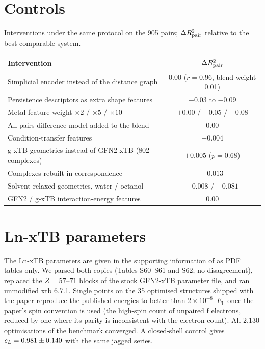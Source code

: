 \section{Controls}
\label{app:controls}
Interventions under the same protocol on the 905 pairs; $\Delta R^2_{\mathrm{pair}}$ relative to the best comparable system.
\begin{center}
  \small
  \begin{tabular}{lc}
    \toprule
    Intervention & $\Delta R^2_{\mathrm{pair}}$ \\
    \midrule
    Simplicial encoder instead of the distance graph & 0.00 ($r = 0.96$, blend weight 0.01) \\
    Persistence descriptors as extra shape features & $-0.03$ to $-0.09$ \\
    Metal-feature weight $\times 2$ / $\times 5$ / $\times 10$ & $+0.00$ / $-0.05$ / $-0.08$ \\
    All-pairs difference model added to the blend & 0.00 \\
    Condition-transfer features & $+0.004$ \\
    g-xTB geometries instead of GFN2-xTB (802 complexes) & $+0.005$ ($p = 0.68$) \\
    Complexes rebuilt in correspondence & $-0.013$ \\
    Solvent-relaxed geometries, water / octanol & $-0.008$ / $-0.081$ \\
    GFN2 / g-xTB interaction-energy features & 0.00 \\
    \bottomrule
  \end{tabular}
\end{center}

\section{Ln-xTB parameters}
\label{app:lnxtb}
The Ln-xTB parameters are given in the supporting information of \citet{lnxtb2026} as PDF tables only. We parsed both copies (Tables S60--S61 and S62; no disagreement), replaced the $Z = 57$--$71$ blocks of the stock GFN2-xTB parameter file, and ran unmodified xtb 6.7.1. Single points on the 35 optimised structures shipped with the paper reproduce the published energies to better than $2 \times 10^{-8}$~$E_{\mathrm{h}}$ once the paper's spin convention is used (the high-spin count of unpaired f electrons, reduced by one where its parity is inconsistent with the electron count). All 2{,}130 optimisations of the benchmark converged. A closed-shell control gives $c_L = 0.981 \pm 0.140$ with the same jagged series.

